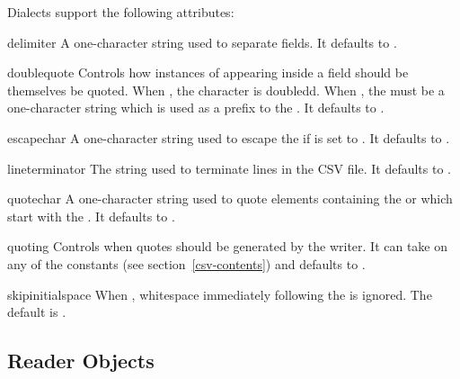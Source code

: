 Dialects support the following attributes:

\begin{memberdesc}[Dialect]{delimiter}
A one-character string used to separate fields.  It defaults to .
\end{memberdesc}

\begin{memberdesc}[Dialect]{doublequote}
Controls how instances of  appearing inside a field should be
themselves be quoted.  When , the character is doubledd.
When , the  must be a one-character string
which is used as a prefix to the .  It defaults to
.
\end{memberdesc}

\begin{memberdesc}[Dialect]{escapechar}
A one-character string used to escape the  if 
is set to .  It defaults to .
\end{memberdesc}

\begin{memberdesc}[Dialect]{lineterminator}
The string used to terminate lines in the CSV file.  It defaults to
.
\end{memberdesc}

\begin{memberdesc}[Dialect]{quotechar}
A one-character string used to quote elements containing the 
or which start with the .  It defaults to .
\end{memberdesc}

\begin{memberdesc}[Dialect]{quoting}
Controls when quotes should be generated by the writer.  It can take on any
of the  constants (see section~\ref{csv-contents})
and defaults to . 
\end{memberdesc}

\begin{memberdesc}[Dialect]{skipinitialspace}
When , whitespace immediately following the 
is ignored.  The default is .
\end{memberdesc}


\subsection{Reader Objects}

